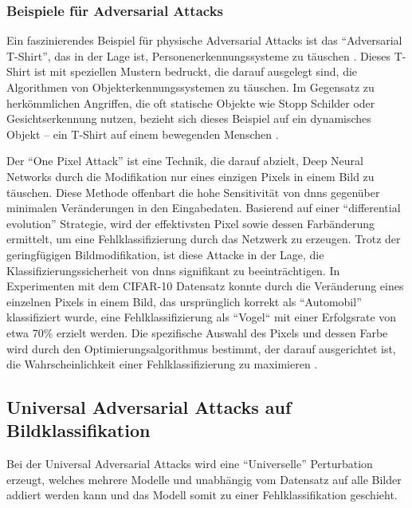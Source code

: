 
\subsubsection{Beispiele für Adversarial Attacks} 

Ein faszinierendes Beispiel für physische Adversarial Attacks ist das  ``Adversarial T-Shirt'', das in der Lage ist, Personenerkennungssysteme zu täuschen \cite{xu_adversarial_2020}. Dieses T-Shirt ist mit speziellen Mustern bedruckt, die darauf ausgelegt sind, die Algorithmen von Objekterkennungssystemen zu täuschen. Im Gegensatz zu herkömmlichen Angriffen, die oft statische Objekte wie Stopp Schilder oder Gesichtserkennung nutzen, bezieht sich dieses Beispiel auf ein dynamisches Objekt – ein T-Shirt auf einem bewegenden Menschen \cite{xu_adversarial_2020}. 

Der ``One Pixel Attack'' \cite{su_one_2019} ist eine Technik, die darauf abzielt, Deep Neural Networks durch die Modifikation nur eines einzigen Pixels in einem Bild zu täuschen. Diese Methode offenbart die hohe Sensitivität von \acrlong{dnn}s gegenüber minimalen Veränderungen in den Eingabedaten. Basierend auf einer ``differential evolution'' Strategie, wird der effektivsten Pixel sowie dessen Farbänderung ermittelt, um eine Fehlklassifizierung durch das Netzwerk zu erzeugen. Trotz der geringfügigen Bildmodifikation, ist diese Attacke in der Lage, die Klassifizierungssicherheit von \acrlong{dnn}s signifikant zu beeinträchtigen.
In Experimenten mit dem CIFAR-10 Datensatz konnte durch die Veränderung eines einzelnen Pixels in einem Bild, das ursprünglich korrekt als ``Automobil'' klassifiziert wurde, eine Fehlklassifizierung als ``Vogel`` mit einer Erfolgsrate von etwa 70\% erzielt werden. Die spezifische Auswahl des Pixels und dessen Farbe wird durch den Optimierungsalgorithmus bestimmt, der darauf ausgerichtet ist, die Wahrscheinlichkeit einer Fehlklassifizierung zu maximieren .

\subsection{Universal Adversarial Attacks auf Bildklassifikation} 


Bei der Universal Adversarial Attacks wird eine ``Universelle'' Perturbation erzeugt, welches mehrere Modelle und unabhängig vom Datensatz auf alle Bilder addiert werden kann und das Modell somit zu einer Fehlklassifikation geschieht. 

